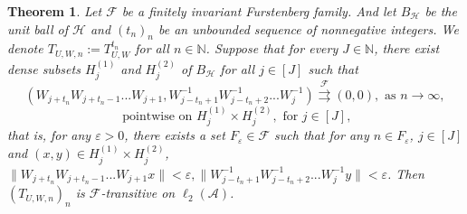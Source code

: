 \documentclass{article}
\newtheorem{theorem}{Theorem}[section]
\begin{document}
\begin{theorem}\label{the3.2}
Let $\mathcal{F}$ be a finitely invariant Furstenberg family. And let $B_{\mathcal{H}}$ be the unit ball of $\mathcal{H}$ and $(t_{n})_{n}$ be an unbounded sequence of nonnegative integers. We denote $T_{U,W,n}:=T^{t_{n}}_{U,W}$ for all $n\in \mathbb{N}$. Suppose that for every $J\in\mathbb{N}$, there exist dense subsets $H^{(1)}_{j}$ and $H^{(2)}_{j}$ of $B_{\mathcal{H}}$ for all $j\in[J]$ such that
\[(W_{j+t_{n}}W_{j+t_{n}-1}...W_{j+1}, W^{-1}_{j-t_{n}+1}W^{-1}_{j-t_{n}+2}...W^{-1}_{j})\stackrel{\mathcal F}{\rightrightarrows}(0,0), \textrm{ as } n\rightarrow \infty,\]
\[ \textrm{ pointwise on } H^{(1)}_{j}\times H^{(2)}_{j}, \textrm{ for } j\in[J],\]
 that is, for any $\varepsilon>0$, there exists a set $F_{\varepsilon}\in\mathcal{F}$ such that for any $n\in F_{\varepsilon}$, $j\in [J]$ and $(x,y)\in H^{(1)}_{j}\times H^{(2)}_{j}$,
$\|W_{j+t_{n}}W_{j+t_{n}-1}...W_{j+1}x\|<\varepsilon, \|W^{-1}_{j-t_{n}+1}W^{-1}_{j-t_{n}+2}...W^{-1}_{j}y\|<\varepsilon$.
Then $(T_{U,W,n})_{n}$ is $\mathcal{F}$-transitive on $\ell_{2}(\mathcal{A})$.
\end{theorem}
\end{document}
